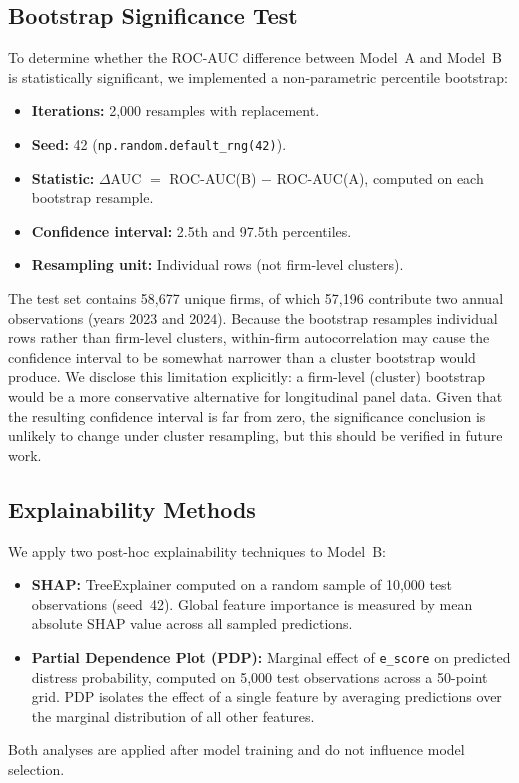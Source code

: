 \documentclass[sigconf,anonymous]{acmart}
\begin{document}
\subsection{Bootstrap Significance Test}
To determine whether the ROC-AUC difference between Model~A and Model~B is statistically significant, we implemented a non-parametric percentile bootstrap:
\begin{itemize}
    \item \textbf{Iterations:} 2,000 resamples with replacement.
    \item \textbf{Seed:} 42 (\texttt{np.random.default\_rng(42)}).
    \item \textbf{Statistic:} $\Delta$AUC $=$ ROC-AUC(B) $-$ ROC-AUC(A), computed on each bootstrap resample.
    \item \textbf{Confidence interval:} 2.5th and 97.5th percentiles.
    \item \textbf{Resampling unit:} Individual rows (not firm-level clusters).
\end{itemize}

The test set contains 58,677 unique firms, of which 57,196 contribute two annual observations (years 2023 and 2024). Because the bootstrap resamples individual rows rather than firm-level clusters, within-firm autocorrelation may cause the confidence interval to be somewhat narrower than a cluster bootstrap would produce. We disclose this limitation explicitly: a firm-level (cluster) bootstrap would be a more conservative alternative for longitudinal panel data. Given that the resulting confidence interval is far from zero, the significance conclusion is unlikely to change under cluster resampling, but this should be verified in future work.

\subsection{Explainability Methods}
We apply two post-hoc explainability techniques to Model~B:
\begin{itemize}
    \item \textbf{SHAP:} TreeExplainer \cite{lundberg2017} computed on a random sample of 10,000 test observations (seed~42). Global feature importance is measured by mean absolute SHAP value across all sampled predictions.
    \item \textbf{Partial Dependence Plot (PDP):} Marginal effect of \texttt{e\_score} on predicted distress probability, computed on 5,000 test observations across a 50-point grid. PDP isolates the effect of a single feature by averaging predictions over the marginal distribution of all other features.
\end{itemize}
Both analyses are applied after model training and do not influence model selection.
\end{document}
